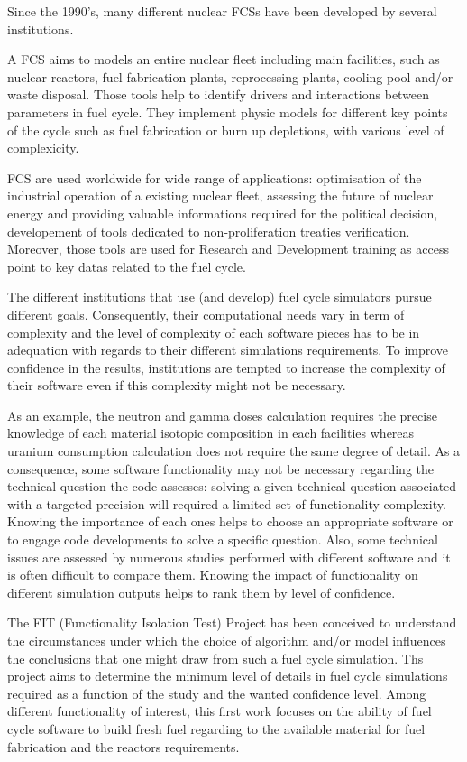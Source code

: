 Since the 1990's, many different nuclear \gls{FCS}s have been
developed by several institutions.

A \gls{FCS} aims to models an entire nuclear fleet including main facilities,
such as nuclear reactors, fuel fabrication plants, reprocessing plants, cooling
pool and/or waste disposal. Those tools help to identify drivers and
interactions between parameters in fuel cycle. They implement physic
models for different key points of the cycle such as fuel fabrication or burn up
depletions, with various level of complexicity. 

\gls{FCS} are used worldwide for wide range of applications: optimisation of the
industrial operation of a existing nuclear fleet, assessing the future of
nuclear energy and providing valuable informations required for the political
decision, developement of tools dedicated to non-proliferation treaties
verification. Moreover, those tools are used for Research and Development
training as access point to key datas related to the fuel cycle. 

The different institutions that use (and develop) fuel cycle simulators pursue
different goals. Consequently, their computational needs vary in term of
complexity and the level of complexity of each software pieces has to be in
adequation with regards to their different simulations requirements. To improve
confidence in the results, institutions are tempted to increase the complexity
of their software even if this complexity might not be necessary.

As an example, the neutron and gamma doses calculation requires the precise
knowledge of each material isotopic composition in each facilities whereas
uranium consumption calculation does not require the same degree of detail. As a
consequence, some software functionality may not be necessary regarding the
technical question the code assesses: solving a given technical question
associated with a targeted precision will required a limited set of
functionality complexity. Knowing the importance of each ones helps to choose an
appropriate software or to engage code developments to solve a specific
question. Also, some technical issues are assessed by numerous studies performed
with different software and it is often difficult to compare them. Knowing the
impact of functionality on different simulation outputs helps to rank them by
level of confidence.

The FIT (Functionality Isolation Test) Project has been conceived to understand
the circumstances under which the choice of algorithm and/or model influences
the conclusions that one might draw from such a fuel cycle simulation. Ths
project aims to determine the minimum level of details in fuel cycle simulations
required as a function of the study and the wanted confidence level. Among
different functionality of interest, this first work focuses on the ability of
fuel cycle software to build fresh fuel regarding to the available material for
fuel fabrication and the reactors requirements.

